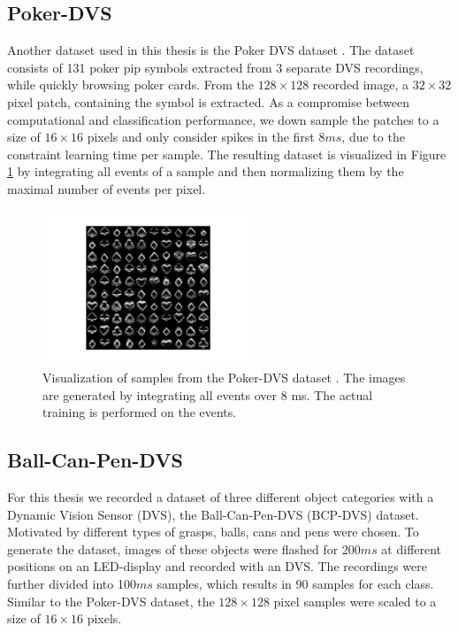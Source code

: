 \subsection{Poker-DVS} \label{c:pokerdvs}

Another dataset used in this thesis is the Poker DVS dataset \cite{serrano2013128}.
The dataset consists of 131 poker pip symbols extracted from 3 separate DVS recordings, while quickly browsing poker cards.
From the $128 \times 128$ recorded image, a $32 \times 32$ pixel patch, containing the symbol is extracted.
As a compromise between computational and classification performance, we down sample the patches to a size of $16 \times 16$ pixels and only consider spikes in the first $8 ms$, due to the constraint learning time per sample.
The resulting dataset is visualized in Figure \ref{fig:pokerdvs} by integrating all events of a sample and then normalizing them by the maximal number of events per pixel.
 
    
\begin{figure}[h!]
	\centering
    	\includegraphics[width=0.55\textwidth]{imgs/poker_ds.png} 
    \caption[Samples from the Poker-DVS dataset.]{Visualization of samples from the Poker-DVS dataset \cite{serrano2013128}. The images are generated by integrating all events over $8$ ms. The actual training is performed on the events.}
	\label{fig:pokerdvs}
\end{figure}


\subsection{Ball-Can-Pen-DVS} \label{c:bcpdvs}

For this thesis we recorded a dataset of three different object categories with a Dynamic Vision Sensor (DVS), the Ball-Can-Pen-DVS (BCP-DVS) dataset.
Motivated by different types of grasps, balls, cans and pens were chosen.   
To generate the dataset, images of these objects were flashed for 200$ms$ at different positions on an LED-display and recorded with an DVS.
The recordings were further divided into 100$ms$ samples, which results in $90$ samples for each class. 
Similar to the Poker-DVS dataset, the $128 \times 128$ pixel samples were scaled to a size of $16 \times 16$ pixels. 

